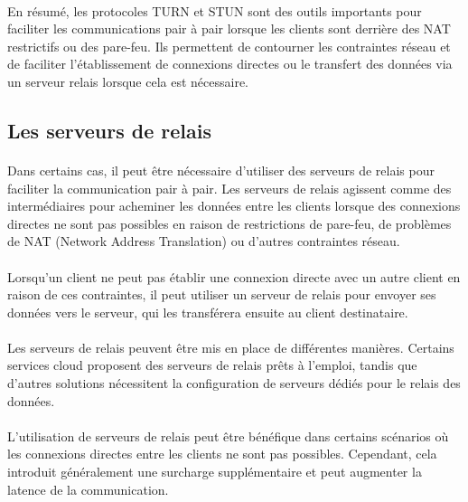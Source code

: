 \paragraph{}
En résumé, les protocoles TURN et STUN sont des outils importants pour faciliter les communications pair à pair lorsque les clients sont derrière des NAT restrictifs ou des pare-feu. Ils permettent de contourner les contraintes réseau et de 
faciliter l'établissement de connexions directes ou le transfert des données via un serveur relais lorsque cela est nécessaire.


\subsection{Les serveurs de relais}

\paragraph{}
Dans certains cas, il peut être nécessaire d'utiliser des serveurs de relais pour faciliter la communication pair à pair. Les serveurs de relais agissent comme des intermédiaires pour acheminer les données entre les 
clients lorsque des connexions directes ne sont pas possibles en raison de restrictions de pare-feu, de problèmes de NAT (Network Address Translation) ou d'autres contraintes réseau.

\paragraph{}
Lorsqu'un client ne peut pas établir une connexion directe avec un autre client en raison de ces contraintes, il peut utiliser un serveur de relais pour envoyer ses données vers le serveur, qui les transférera ensuite au client destinataire.

\paragraph{}
Les serveurs de relais peuvent être mis en place de différentes manières. Certains services cloud proposent des serveurs de relais prêts à l'emploi, tandis que d'autres solutions nécessitent la configuration de serveurs dédiés pour le relais des données.

\paragraph{}
L'utilisation de serveurs de relais peut être bénéfique dans certains scénarios où les connexions directes entre les clients ne sont pas possibles. Cependant, cela introduit généralement une surcharge supplémentaire et peut augmenter la latence de la communication.

